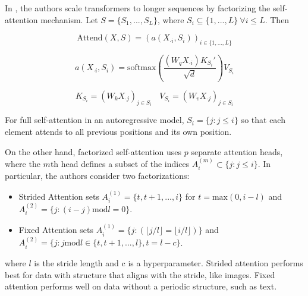 \documentclass[11pt]{article}
\theoremstyle{definition}
\begin{document}
In \cite{child2019generating}, the authors scale transformers to longer sequences by factorizing the self-attention mechanism. Let $S = \{S_1,...,S_L \}$, where $S_i \subseteq \{1,...,L \} \ \forall i \leq L$. Then

\begin{equation}
\mathrm{Attend}(X,S) = \left( a(X_{\cdot i}, S_i) \right)_{i \in \{1,...,L\}}
\end{equation}

\begin{equation}
a(X_{\cdot i}, S_i) = \mathrm{softmax}\left( \frac{(W_qX_{\cdot i})K_{S_i}'}{\sqrt{d}} \right) V_{S_i}
\end{equation}

\begin{equation}
K_{S_i} = \left( W_k X_{\cdot j} \right)_{j \in S_i} \ \ \ \ V_{S_i} = \left( W_v X_{\cdot j} \right)_{j \in S_i}
\end{equation}

For full self-attention in an autoregressive model, $S_i = \{ j : j \leq i \}$ so that each element attends to all previous positions and its own position.

On the other hand, factorized self-attention uses $p$ separate attention heads, where the $m$th head defines a subset of the indices $A_i^{(m)} \subset \{j : j \leq i \}$. In particular, the authors consider two factorizations:

\begin{itemize}
\item Strided Attention sets $A_i^{(1)} = \{t,t+1,...,i \}$ for $t = \mathrm{max}(0,i-l)$ and $A_i^{(2)} = \{j : (i-j) \mathrm{mod} l =0 \}$.
\item Fixed Attention sets $A_i^{(1)} = \{j : (\lfloor j/l \rfloor = \lfloor i/l \rfloor) \}$ and $A_i^{(2)} = \{ j : j \mathrm{mod} l \in \{ t, t+1,...,l \}, t = l-c \}$.
\end{itemize}

where $l$ is the stride length and c is a hyperparameter. Strided attention performs best for data with structure that aligns with the stride, like images. Fixed attention performs well on data without a periodic structure, such as text.
\end{document}
